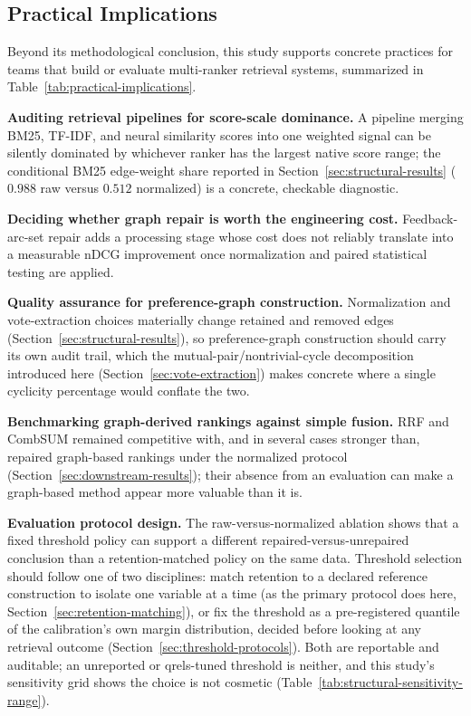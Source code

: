 \documentclass[manuscript,anonymous,review]{acmart}
\begin{document}
\subsection{Practical Implications}
\label{sec:practical-implications}

Beyond its methodological conclusion, this study supports concrete practices
for teams that build or evaluate multi-ranker retrieval systems, summarized in
Table~\ref{tab:practical-implications}.

\textbf{Auditing retrieval pipelines for score-scale dominance.} A pipeline
merging BM25, TF-IDF, and neural similarity scores into one weighted signal
can be silently dominated by whichever ranker has the largest native score
range; the conditional BM25 edge-weight share reported in
Section~\ref{sec:structural-results} ($0.988$ raw versus $0.512$ normalized)
is a concrete, checkable diagnostic.

\textbf{Deciding whether graph repair is worth the engineering cost.}
Feedback-arc-set repair adds a processing stage whose cost does not reliably
translate into a measurable nDCG improvement once normalization and paired
statistical testing are applied.

\textbf{Quality assurance for preference-graph construction.} Normalization
and vote-extraction choices materially change retained and removed edges
(Section~\ref{sec:structural-results}), so preference-graph construction
should carry its own audit trail, which the mutual-pair/nontrivial-cycle
decomposition introduced here (Section~\ref{sec:vote-extraction}) makes
concrete where a single cyclicity percentage would conflate the two.

\textbf{Benchmarking graph-derived rankings against simple fusion.} RRF and
CombSUM remained competitive with, and in several cases stronger than,
repaired graph-based rankings under the normalized protocol
(Section~\ref{sec:downstream-results}); their absence from an evaluation can
make a graph-based method appear more valuable than it is.

\textbf{Evaluation protocol design.} The raw-versus-normalized ablation shows
that a fixed threshold policy can support a different repaired-versus-unrepaired
conclusion than a retention-matched policy on the same data. Threshold
selection should follow one of two disciplines: match retention to a
declared reference construction to isolate one variable at a time (as the
primary protocol does here, Section~\ref{sec:retention-matching}), or fix
the threshold as a pre-registered quantile of the calibration's own margin
distribution, decided before looking at any retrieval outcome
(Section~\ref{sec:threshold-protocols}). Both are reportable and auditable;
an unreported or qrels-tuned threshold is neither, and this study's
sensitivity grid shows the choice is not cosmetic (Table~\ref{tab:structural-sensitivity-range}).
\end{document}
